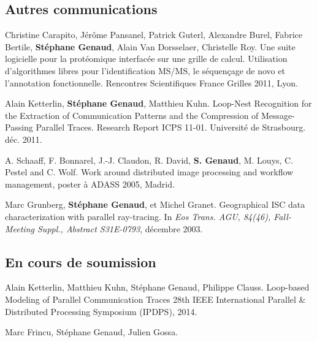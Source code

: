 \documentclass[11pt]{article}
\begin{document}
\begin{thebibliography}{99}
\subsection*{Autres communications}

Christine Carapito, Jérôme Pansanel, Patrick Guterl, Alexandre Burel, Fabrice 
Bertile, \textbf{Stéphane Genaud}, Alain Van Dorsselaer, Christelle Roy.
\newblock Une suite logicielle pour la protéomique interfacée sur une grille de 
calcul. Utilisation d'algorithmes libres pour l'identification MS/MS, le 
séquençage de novo et l'annotation fonctionnelle.
\newblock Rencontres Scientifiques France Grilles 2011, Lyon.


Alain Ketterlin, \textbf{Stéphane Genaud}, Matthieu Kuhn.
\newblock Loop-Nest Recognition for the Extraction of Communication Patterns 
and the Compression of Message-Passing Parallel Traces.
\newblock Research Report ICPS 11-01. Université de Strasbourg. déc. 2011.


A. Schaaff, F. Bonnarel, J.-J. Claudon, R. David, \textbf{S. Genaud}, M. Louys, 
C. Pestel and C. Wolf.
\newblock Work around distributed image processing and workflow management, 
\newblock poster à ADASS 2005, Madrid.


Marc Grunberg, \textbf{Stéphane Genaud}, et Michel Granet.
\newblock Geographical {ISC} data characterization with parallel ray-tracing.
\newblock In {\em Eos Trans. AGU, 84(46), Fall-Meeting Suppl., Abstract
  S31E-0793}, décembre 2003.


\subsection*{En cours de soumission}


Alain Ketterlin, Matthieu Kuhn, Stéphane Genaud, Philippe Clauss.
\newblock Loop-based Modeling of Parallel Communication Traces
\newblock 28th IEEE International Parallel \& Distributed Processing Symposium (IPDPS),
2014.

Marc Frincu, Stéphane Genaud, Julien Gossa.



\newblock
\end{thebibliography}


\newpage
\subsectionfont{\sectionrule{3ex}{0pt}{-1ex}{1pt}}



\end{document}
